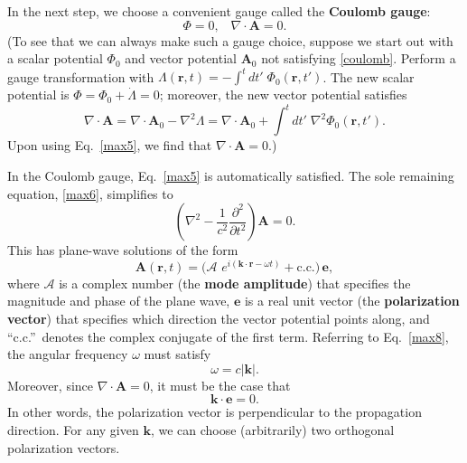 \documentclass[prx,12pt]{revtex4-2}
\begin{document}
In the next step, we choose a convenient gauge called the
\textbf{Coulomb gauge}:
\begin{equation}
  \Phi = 0, \;\;\; \nabla \cdot \mathbf{A} = 0.
  \label{coulomb}
\end{equation}
(To see that we can always make such a gauge choice, suppose we start
out with a scalar potential $\Phi_0$ and vector potential
$\mathbf{A}_0$ not satisfying \eqref{coulomb}.  Perform a gauge
transformation with $\Lambda(\mathbf{r}, t) = - \int^t dt'\;
\Phi_0(\mathbf{r}, t')$.  The new scalar potential is $\Phi = \Phi_0 +
\dot{\Lambda} = 0$; moreover, the new vector potential satisfies
\begin{equation}
  \nabla\cdot\mathbf{A} = \nabla\cdot \mathbf{A}_0 - \nabla^2 \Lambda
  = \nabla\cdot \mathbf{A}_0 + \int^t dt'\; \nabla^2\Phi_0(\mathbf{r}, t').
\end{equation}
Upon using Eq.~\eqref{max5}, we find that $\nabla\cdot\mathbf{A} =
0$.)

In the Coulomb gauge, Eq.~\eqref{max5} is automatically satisfied.
The sole remaining equation, \eqref{max6}, simplifies to
\begin{equation}
  \left(\nabla^2 - \frac{1}{c^2}\frac{\partial^2}{\partial t^2}\right)
  \mathbf{A} = 0. \label{max8}
\end{equation}
This has plane-wave solutions of the form
\begin{equation}
  \mathbf{A}(\mathbf{r},t) = \Big(\mathcal{A}\, \,
  e^{i(\mathbf{k}\cdot\mathbf{r} - \omega t)} + \mathrm{c.c.}\Big)\,
  \mathbf{e},
  \label{lightplanewave}
\end{equation}
where $\mathcal{A}$ is a complex number (the \textbf{mode amplitude})
that specifies the magnitude and phase of the plane wave, $\mathbf{e}$
is a real unit vector (the \textbf{polarization vector}) that
specifies which direction the vector potential points along, and
``c.c.''~denotes the complex conjugate of the first term.  Referring
to Eq.~\eqref{max8}, the angular frequency $\omega$ must satisfy
\begin{equation}
  \omega = c|\mathbf{k}|.
\end{equation}
Moreover, since $\nabla \cdot \mathbf{A} = 0$, it must be the case
that
\begin{equation}
  \mathbf{k} \cdot \mathbf{e} = 0.
\end{equation}
In other words, the polarization vector is perpendicular to the
propagation direction.  For any given $\mathbf{k}$, we can choose
(arbitrarily) two orthogonal polarization vectors.
\end{document}
